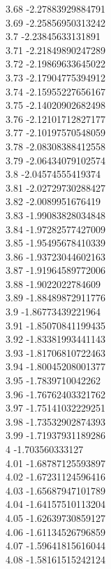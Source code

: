 {3.68	-2.27883929884791\\
3.69	-2.25856950313242\\
3.7	-2.23845633131891\\
3.71	-2.21849890247289\\
3.72	-2.19869633645022\\
3.73	-2.17904775394912\\
3.74	-2.15955227656167\\
3.75	-2.14020902682498\\
3.76	-2.12101712827177\\
3.77	-2.10197570548059\\
3.78	-2.08308388412558\\
3.79	-2.06434079102574\\
3.8	-2.04574555419374\\
3.81	-2.02729730288427\\
3.82	-2.0089951676419\\
3.83	-1.99083828034848\\
3.84	-1.97282577427009\\
3.85	-1.95495678410339\\
3.86	-1.93723044602163\\
3.87	-1.91964589772006\\
3.88	-1.9022022784609\\
3.89	-1.88489872911776\\
3.9	-1.86773439221964\\
3.91	-1.85070841199435\\
3.92	-1.83381993441143\\
3.93	-1.81706810722463\\
3.94	-1.80045208001377\\
3.95	-1.7839710042262\\
3.96	-1.76762403321762\\
3.97	-1.75141032229251\\
3.98	-1.73532902874393\\
3.99	-1.71937931189286\\
4	-1.703560333127\\
4.01	-1.68787125593897\\
4.02	-1.67231124596416\\
4.03	-1.65687947101789\\
4.04	-1.64157510113204\\
4.05	-1.62639730859127\\
4.06	-1.61134526796859\\
4.07	-1.59641815616044\\
4.08	-1.58161515242124\\
}
